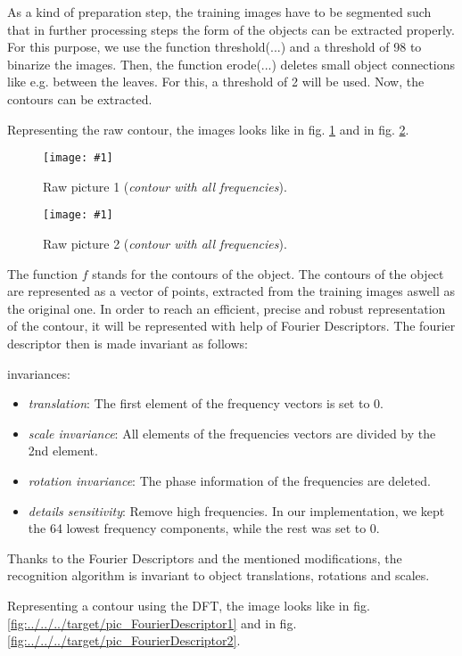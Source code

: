\documentclass[a4paper,headings=small]{scrartcl}
\numberwithin{equation}{section} %
\numberwithin{figure}{section}   %
\newcommand{\image}[3]{
	\begin{figure}[htbp]
		\centering
		\texttt{[image: \#1]}
		\caption{#3}
		\label{fig:#1}
	\end{figure}
}
\newcommand{\generatedImgRoot}{../../../target}
\newcommand{\iBinThreshold}{98}
\newcommand{\iNumOfErosions}{2}
\newcommand{\iFDNormDimensions}{64} %
\begin{document}
As a kind of preparation step, the training images have to be segmented such that in 
further processing steps the form of the objects can be extracted properly.
For this purpose, we use the function threshold(...) and a threshold of \iBinThreshold{} to binarize the images.
Then, the function erode(...) deletes small object connections like e.g. between the leaves.
For this, a threshold of \iNumOfErosions{} will be used.
Now, the contours can be extracted.

Representing the raw contour, the images looks like in fig. \ref{fig:\generatedImgRoot/pic_RawFourierDescriptor1} 
and in fig. \ref{fig:\generatedImgRoot/pic_RawFourierDescriptor2}.

\image{\generatedImgRoot/pic_RawFourierDescriptor1}{0.2}{%
		Raw picture 1 (\emph{contour with all frequencies}).}
\image{\generatedImgRoot/pic_RawFourierDescriptor2}{0.5}{%
		Raw picture 2 (\emph{contour with all frequencies}).}


The function $f$ stands for the contours of the object.
The contours of the object are represented as a vector of points, extracted from the training
images aswell as the original one. In order to reach an efficient, precise and robust representation of the contour, 
it will be represented with help of Fourier Descriptors.
The fourier descriptor then is made invariant as follows:

invariances:
\begin{itemize}
\item \emph{translation}: The first element of the frequency vectors is set to 0.
\item \emph{scale invariance}:  All elements of the frequencies vectors are divided by the 2nd element.
\item \emph{rotation invariance}: The phase information of the frequencies are deleted.
\item \emph{details sensitivity}: Remove high frequencies.
  In our implementation, we kept the \iFDNormDimensions{} lowest frequency components,
  while the rest was set to 0.
\end{itemize}

Thanks to the Fourier Descriptors and the mentioned modifications, 
the recognition algorithm is invariant to object translations,
rotations and scales.

Representing a contour using the DFT, the image looks like in fig. \ref{fig:\generatedImgRoot/pic_FourierDescriptor1} 
and in fig. \ref{fig:\generatedImgRoot/pic_FourierDescriptor2}.
\end{document}
